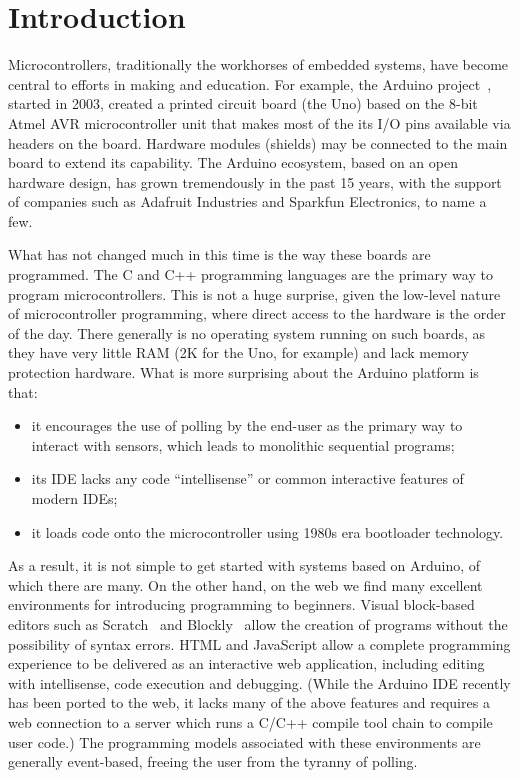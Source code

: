 \section{Introduction}
\label{sec:intro}

Microcontrollers, traditionally the workhorses of embedded systems, have become 
central to efforts in making and education. For example, the Arduino project~\cite{XYZ}, 
started in 2003, created a printed circuit board (the Uno) based on the 8-bit Atmel 
AVR microcontroller unit that makes most of the its I/O pins available via headers on 
the board.  Hardware modules (shields) may be connected to the main board to extend its capability. 
The Arduino ecosystem, based on an open hardware design, has grown tremendously in the past 15 years, 
with the support of companies such as Adafruit Industries and Sparkfun Electronics, to name a few.

What has not changed much in this time is the way these boards are programmed.  
The C and C++ programming languages are the primary way to program microcontrollers. 
This is not a huge surprise, given the low-level nature of microcontroller programming, 
where direct access to the hardware is the order of the day. There generally is no operating 
system running on such boards, as they have very little RAM (2K for the Uno, for example) and 
lack memory protection hardware.  What is more surprising about the Arduino platform is that:
\begin{itemize}
\item it encourages the use of polling by the end-user as the primary way to interact with sensors, 
which leads to monolithic sequential programs;
\item its IDE lacks any code ``intellisense'' or common interactive features of modern IDEs;
\item it loads code onto the microcontroller using 1980s era bootloader technology.
\end{itemize}
As a result, it is not simple to get started with systems based on Arduino, of which there are many. 
On the other hand, on the web we find many excellent environments for introducing programming to beginners. 
Visual block-based editors such as Scratch~\cite{XYZ} and Blockly~\cite{XYZ} 
allow the creation of programs without the possibility 
of syntax errors. HTML and JavaScript allow a complete programming experience to be delivered as an interactive 
web application, including editing with intellisense, code execution and debugging. (While the Arduino IDE recently 
has been ported to the web, it lacks many of the above features and requires a web connection to a server which runs 
a C/C++ compile tool chain to compile user code.) The programming models associated with these environments are 
generally event-based, freeing the user from the tyranny of polling.

